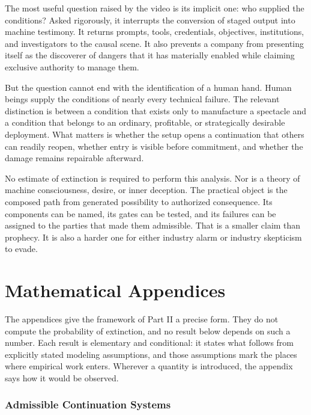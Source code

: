 \documentclass[11pt]{article}
\theoremstyle{definition}
\begin{document}
The most useful question raised by the video is its implicit one: who supplied the conditions? Asked rigorously, it interrupts the conversion of staged output into machine testimony. It returns prompts, tools, credentials, objectives, institutions, and investigators to the causal scene. It also prevents a company from presenting itself as the discoverer of dangers that it has materially enabled while claiming exclusive authority to manage them.

But the question cannot end with the identification of a human hand. Human beings supply the conditions of nearly every technical failure. The relevant distinction is between a condition that exists only to manufacture a spectacle and a condition that belongs to an ordinary, profitable, or strategically desirable deployment. What matters is whether the setup opens a continuation that others can readily reopen, whether entry is visible before commitment, and whether the damage remains repairable afterward.

No estimate of extinction is required to perform this analysis. Nor is a theory of machine consciousness, desire, or inner deception. The practical object is the composed path from generated possibility to authorized consequence. Its components can be named, its gates can be tested, and its failures can be assigned to the parties that made them admissible. That is a smaller claim than prophecy. It is also a harder one for either industry alarm or industry skepticism to evade.

\part{Mathematical Appendices}

\noindent The appendices give the framework of Part II a precise form. They do not compute the probability of extinction, and no result below depends on such a number. Each result is elementary and conditional: it states what follows from explicitly stated modeling assumptions, and those assumptions mark the places where empirical work enters. Wherever a quantity is introduced, the appendix says how it would be observed.

\appendix

\section{Admissible Continuation Systems}\label{app:A}
\end{document}
